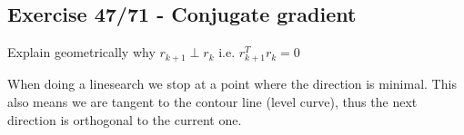 \subsection{Exercise 47/71 - Conjugate gradient}

Explain geometrically why $r_{k+1} \perp r_k$ i.e. $r_{k+1}^T r_k = 0$

\answer

When doing a linesearch we stop at a point where the direction is minimal. This also means we are tangent to the contour line (level curve), thus the next direction is orthogonal to the current one.






















